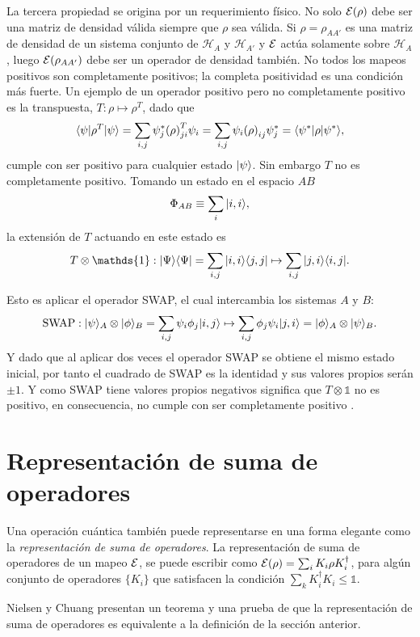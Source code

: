 La tercera propiedad se origina por un requerimiento físico. No solo $\mathcal{E}(\rho)$ debe ser una matriz de densidad válida siempre que $\rho$ sea válida. Si $\rho=\rho_{AA'}$ es una matriz de densidad de un sistema conjunto de $\mathcal{H}_A$ y $\mathcal{H}_{A'}$  y $\mathcal{E}$ actúa solamente sobre $\mathcal{H}_A$, luego $\mathcal{E}(\rho_{AA'})$  debe ser un operador de densidad también. No todos los mapeos positivos son completamente positivos; la completa positividad es una condición más fuerte. Un ejemplo de un operador positivo pero no completamente positivo es la transpuesta, $T:\rho \mapsto {\rho}^T$, dado que \[\langle \psi |{\rho}^T| \psi \rangle=\sum_{i,j} \psi _j^* {(\rho)}^T _{ji} \psi _i=\sum _{i,j} \psi _i{(\rho)} _{ij} \psi_j^{*}=\langle {\psi}^*|\rho|\psi ^*\rangle,\] cumple con ser positivo para cualquier estado $| \psi \rangle$. Sin embargo $ {T} $ no es completamente positivo. Tomando un estado en el espacio $AB$ \[\Phi_{AB} \equiv \sum_i |i,i\rangle, \] la extensión de $T$ actuando en este estado es \[T \otimes \mathds{1}:|\Psi\rala \Psi|=\sum_{i,j}|i,i\rala j,j| \mapsto \sum_{i,j}|j,i\rala i,j|.\]

Esto es aplicar el operador SWAP, el cual intercambia los sistemas $A$ y $B$:
\begin{equation}
    \text{SWAP}:|\psi\rangle_A\otimes|\phi\rangle_B=\sum_{i,j}\psi_i\phi_j |i,j\rangle\mapsto\sum_{i,j}\phi_j\psi_i|j,i\rangle=|\phi\rangle_A\otimes|\psi\rangle_B.
\end{equation} Y dado que al aplicar dos veces el operador SWAP se obtiene el mismo estado inicial, por tanto el cuadrado de SWAP es la identidad y sus valores propios serán $\pm 1$. Y como SWAP tiene valores propios negativos significa que $T \otimes \mathds{1}$ no es positivo, en consecuencia, no cumple con ser completamente positivo  {\cite{preskill2020quantum}}.





\section{Representación de suma de operadores}

Una operación cuántica también puede representarse en una forma elegante como la \textit{representación de suma de operadores}. La representación de suma de operadores de un mapeo $\mathcal{E}$, se puede escribir como $\mathcal{E}(\rho)=\sum_i K_i \rho K_i^\dagger$, para algún conjunto de operadores $\{K_i\}$ que satisfacen la condición $\sum_k K_i^\dagger K_i\le \mathds{1}$.

Nielsen y Chuang {\cite{nielsen_chuang_2010}} presentan un teorema y una prueba de que la representación de suma de operadores es equivalente a la definición de la sección anterior.

